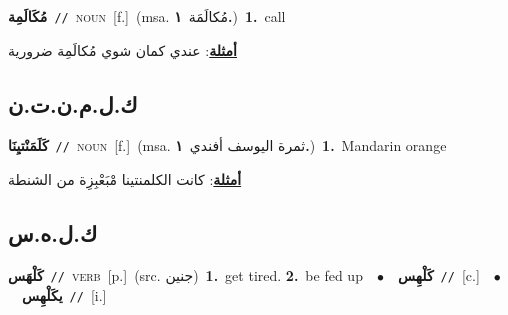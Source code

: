 \documentclass[10pt,a4paper,twoside]{article} %
\begin{document}
\begin{multicols}{2}
{\setlength\topsep{0pt}\textbf{\foreignlanguage{arabic}{مُكَالَمِة}}\ {\color{gray}\texttt{//}\color{black}}\ \textsc{noun}\ [f.]\ \color{gray}(msa. \foreignlanguage{arabic}{مُكالَمَة}~\foreignlanguage{arabic}{\textbf{١.}})\color{black}\ \textbf{1.}~call\  \begin{flushright}\color{gray}\foreignlanguage{arabic}{\textbf{\underline{\foreignlanguage{arabic}{أمثلة}}}: عندي كمان شوي مُكالَمِة ضرورية}\end{flushright}\color{black}} \vspace{2mm}

\vspace{-3mm}
\subsection*{\color{blue}\foreignlanguage{arabic}{ك.ل.م.ن.ت.ن}\color{blue}{ (ntws)}} 

{\setlength\topsep{0pt}\textbf{\foreignlanguage{arabic}{كَلَمَنْتيِنَا}}\ {\color{gray}\texttt{//}\color{black}}\ \textsc{noun}\ [f.]\ \color{gray}(msa. \foreignlanguage{arabic}{ثمرة اليوسف أفندي}~\foreignlanguage{arabic}{\textbf{١.}})\color{black}\ \textbf{1.}~Mandarin orange\  \begin{flushright}\color{gray}\foreignlanguage{arabic}{\textbf{\underline{\foreignlanguage{arabic}{أمثلة}}}: كانت الكلمنتينا مْبَعْبِزِة من الشنطة}\end{flushright}\color{black}} \vspace{2mm}

\vspace{-3mm}
\subsection*{\color{blue}\foreignlanguage{arabic}{ك.ل.ه.س}\color{blue}{}} 

{\setlength\topsep{0pt}\textbf{\foreignlanguage{arabic}{كَلْهَس}}\ {\color{gray}\texttt{//}\color{black}}\ \textsc{verb}\ [p.]\ (src. \color{gray}\foreignlanguage{arabic}{جنين}\color{black})\ \textbf{1.}~get tired.  \textbf{2.}~be fed up\ \ $\bullet$\ \ \setlength\topsep{0pt}\textbf{\foreignlanguage{arabic}{كَلْهِس}}\ {\color{gray}\texttt{//}\color{black}}\ [c.]\ \ $\bullet$\ \ \setlength\topsep{0pt}\textbf{\foreignlanguage{arabic}{يكَلْهِس}}\ {\color{gray}\texttt{//}\color{black}}\ [i.]\ } \vspace{2mm}


\end{multicols}
\end{document}
